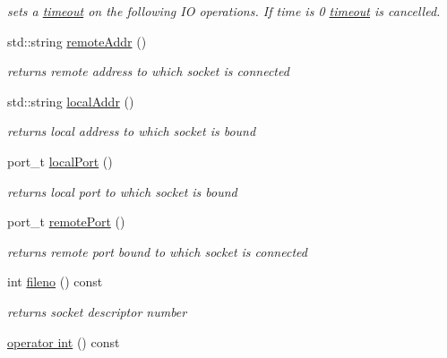 \begin{CompactItemize}
\begin{CompactList}\small\item\em sets a \hyperlink{classsocketpp_1_1timeout}{timeout} on the following IO operations. If time is 0 \hyperlink{classsocketpp_1_1timeout}{timeout} is cancelled. \item\end{CompactList}\item 
std::string \hyperlink{classsocketpp_1_1BaseSocket_483c6186ae60d0c399983e14f55af600}{remoteAddr} ()
\begin{CompactList}\small\item\em returns remote address to which socket is connected \item\end{CompactList}\item 
std::string \hyperlink{classsocketpp_1_1BaseSocket_0caed2e7d3f0e4db7d4c1aa3aba52caf}{localAddr} ()
\begin{CompactList}\small\item\em returns local address to which socket is bound \item\end{CompactList}\item 
port\_\-t \hyperlink{classsocketpp_1_1BaseSocket_d4a2c0e4932436ef61f911514385d16c}{localPort} ()
\begin{CompactList}\small\item\em returns local port to which socket is bound \item\end{CompactList}\item 
port\_\-t \hyperlink{classsocketpp_1_1BaseSocket_039db642444d2111f2f58ebe032c5f5f}{remotePort} ()
\begin{CompactList}\small\item\em returns remote port bound to which socket is connected \item\end{CompactList}\item 
int \hyperlink{classsocketpp_1_1BaseSocket_c96db07cc917926d895d89cf73734ea1}{fileno} () const 
\begin{CompactList}\small\item\em returns socket descriptor number \item\end{CompactList}\item 
\hypertarget{classsocketpp_1_1BaseSocket_fa397f810462fe61238dbbf2d9c42c90}{
\hyperlink{classsocketpp_1_1BaseSocket_fa397f810462fe61238dbbf2d9c42c90}{operator int} () const }
\label{classsocketpp_1_1BaseSocket_fa397f810462fe61238dbbf2d9c42c90}


\end{CompactItemize}
